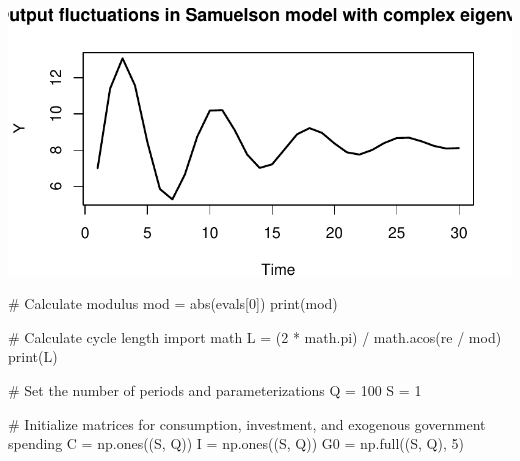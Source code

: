 \documentclass[
  letterpaper,
  DIV=11,
  numbers=noendperiod]{scrreprt}
\newenvironment{Shaded}{\begin{snugshade}}{\end{snugshade}}
\newcommand{\BuiltInTok}[1]{\textcolor[rgb]{0.00,0.23,0.31}{#1}}
\newcommand{\CommentTok}[1]{\textcolor[rgb]{0.37,0.37,0.37}{#1}}
\newcommand{\DecValTok}[1]{\textcolor[rgb]{0.68,0.00,0.00}{#1}}
\newcommand{\ImportTok}[1]{\textcolor[rgb]{0.00,0.46,0.62}{#1}}
\newcommand{\NormalTok}[1]{\textcolor[rgb]{0.00,0.23,0.31}{#1}}
\newcommand{\OperatorTok}[1]{\textcolor[rgb]{0.37,0.37,0.37}{#1}}
\begin{document}
\includegraphics{intro_stability_analysis_files/figure-pdf/stab_analysis5-2.pdf}

\begin{tcolorbox}[enhanced jigsaw, titlerule=0mm, breakable, bottomrule=.15mm, toprule=.15mm, colbacktitle=quarto-callout-note-color!10!white, rightrule=.15mm, toptitle=1mm, opacityback=0, left=2mm, coltitle=black, title=\textcolor{quarto-callout-note-color}{\faInfo}\hspace{0.5em}{Python code}, colframe=quarto-callout-note-color-frame, opacitybacktitle=0.6, leftrule=.75mm, bottomtitle=1mm, arc=.35mm, colback=white]

\begin{Shaded}
\begin{Highlighting}[]
\CommentTok{\# Calculate modulus}
\NormalTok{mod }\OperatorTok{=} \BuiltInTok{abs}\NormalTok{(evals[}\DecValTok{0}\NormalTok{])}
\BuiltInTok{print}\NormalTok{(mod)}

\CommentTok{\# Calculate cycle length}
\ImportTok{import}\NormalTok{ math}
\NormalTok{L }\OperatorTok{=}\NormalTok{ (}\DecValTok{2} \OperatorTok{*}\NormalTok{ math.pi) }\OperatorTok{/}\NormalTok{ math.acos(re }\OperatorTok{/}\NormalTok{ mod)}
\BuiltInTok{print}\NormalTok{(L)}

\CommentTok{\# Set the number of periods and parameterizations}
\NormalTok{Q }\OperatorTok{=} \DecValTok{100}
\NormalTok{S }\OperatorTok{=} \DecValTok{1}

\CommentTok{\# Initialize matrices for consumption, investment, and exogenous government spending}
\NormalTok{C }\OperatorTok{=}\NormalTok{ np.ones((S, Q))}
\NormalTok{I }\OperatorTok{=}\NormalTok{ np.ones((S, Q))}
\NormalTok{G0 }\OperatorTok{=}\NormalTok{ np.full((S, Q), }\DecValTok{5}\NormalTok{)}


\end{Highlighting}
\end{Shaded}
\end{tcolorbox}
\end{document}
